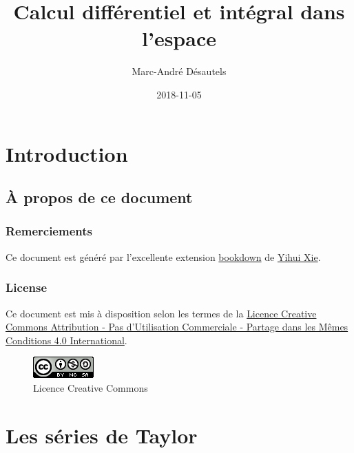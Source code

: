 \documentclass[]{book}
\title{Calcul différentiel et intégral dans l'espace}
\author{Marc-André Désautels}
\date{2018-11-05}
\theoremstyle{definition}
\theoremstyle{definition}
\theoremstyle{definition}
\theoremstyle{remark}
\begin{document}
\maketitle

{
\setcounter{tocdepth}{2}
\tableofcontents
}
\hypertarget{introduction}{%
\chapter*{Introduction}\label{introduction}}

\hypertarget{a-propos-de-ce-document}{%
\section*{À propos de ce document}\label{a-propos-de-ce-document}}

\hypertarget{remerciements}{%
\subsection*{Remerciements}\label{remerciements}}

Ce document est généré par l'excellente extension
\href{https://bookdown.org/}{bookdown} de
\href{https://yihui.name/}{Yihui Xie}.

\hypertarget{license}{%
\subsection*{License}\label{license}}

Ce document est mis à disposition selon les termes de la
\href{http://creativecommons.org/licenses/by-nc-sa/4.0/}{Licence
Creative Commons Attribution - Pas d'Utilisation Commerciale - Partage
dans les Mêmes Conditions 4.0 International}.

\begin{figure}
\centering
\includegraphics{resources/icons/license_cc.png}
\caption{Licence Creative Commons}
\end{figure}

\hypertarget{taylor}{%
\chapter{Les séries de Taylor}\label{taylor}}
\end{document}
